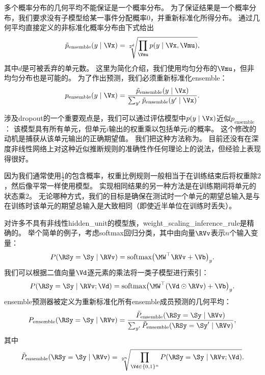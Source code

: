 多个概率分布的几何平均不能保证是一个概率分布。
为了保证结果是一个概率分布，我们要求没有子模型给某一事件分配概率0，并重新标准化所得分布。
通过几何平均直接定义的非标准化概率分布由下式给出
\begin{align}
\tilde{p}_{\text{ensemble}}(y \mid \Vx) = \sqrt[2^d]{\prod_{\Vmu} p(y \mid \Vx, \Vmu)},
\end{align}
其中$d$是可被丢弃的单元数。
这里为简化介绍，我们使用均匀分布的$\Vmu$，但非均匀分布也是可能的。
为了作出预测，我们必须重新标准化\gls{ensemble}：
\begin{align}
p_{\text{ensemble}}(y \mid \Vx)  = \frac{\tilde{p}_{\text{ensemble}}(y \mid \Vx)}
 {\sum_{y'}\tilde{p}_{\text{ensemble}}(y' \mid \Vx) }.
\end{align}
 
涉及\gls{dropout}的一个重要观点\citep{Hinton-et-al-arxiv2012}是，我们可以通过评估模型中$p(y \mid \Vx)$近似$ p_{\text{ensemble}}$：
该模型具有所有单元，但单元$i$输出的权重乘以包括单元$i$的概率。
这个修改的动机是捕获从该单元输出的正确期望值。
我们把这种方法称为。
目前还没有在深度非线性网络上对这种近似推断规则的准确性作任何理论上的说法，但经验上表现得很好。

 
因为我们通常使用$\frac{1}{2}$的包含概率，权重比例规则一般相当于在训练结束后将权重除$2$，然后像平常一样使用模型。
实现相同结果的另一种方法是在训练期间将单元的状态乘$2$。
无论哪种方式，我们的目标是确保在测试时一个单元的期望总输入是与在训练时该单元的期望总输入是大致相同（即使近半单位在训练时丢失）。

对许多不具有非线性\gls{hidden_unit}的模型族，\gls{weight_scaling_inference_rule}是精确的。
举个简单的例子，考虑\gls{softmax}回归分类，其中由向量$\RVv$表示$n$个输入变量：
\begin{align}
 P(\RSy = \Sy \mid \RVv) = \text{softmax}\big(\MW^\top\RVv + \Vb\big)_y.
\end{align}
我们可以根据二值向量$\Vd$逐元素的乘法将一类子模型进行索引：
\begin{align}
P(\RSy = \Sy \mid \RVv; \Vd) = \text{softmax}\big(\MW^\top(\Vd \odot \RVv) + \Vb \big)_y.
\end{align}
\gls{ensemble}预测器被定义为重新标准化所有\gls{ensemble}成员预测的几何平均：
\begin{align} \label{eq:758pe}
P_{\text{ensemble}}(\RSy = \Sy \mid \RVv)  = \frac{\tilde{P}_{\text{ensemble}}(\RSy = \Sy \mid \RVv)}
 {\sum_{y'}\tilde{P}_{\text{ensemble}}(\RSy = \Sy' \mid \RVv) },
\end{align}
其中
\begin{align}
\tilde{P}_{\text{ensemble}}(\RSy=\Sy \mid \RVv) =
\sqrt[2^n]{\prod_{\Vd \in \{0,1\}^n} P(\RSy = \Sy \mid \RVv; \Vd)}.
\end{align}

